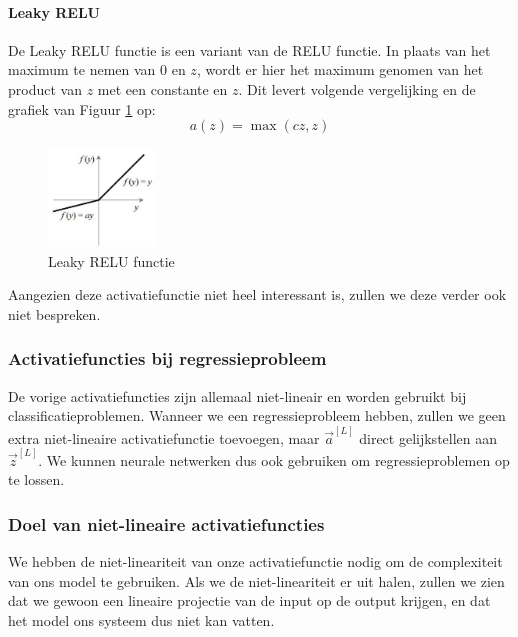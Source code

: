 \paragraph{Leaky RELU}

De Leaky RELU functie is een variant van de RELU functie. In plaats van het maximum te nemen van 0 en $z$, wordt er hier het maximum genomen van het product van $z$ met een constante en $z$. Dit levert volgende vergelijking en de grafiek van Figuur \ref{fig:leaky-relu} op:
\begin{equation}
	a(z) = \max(cz, z)
\end{equation}

\begin{figure}[h]
	\centering
	\includegraphics[width=0.25\textwidth]{images/17-leaky-relu.png}
	\caption{Leaky RELU functie}
	\label{fig:leaky-relu}
\end{figure}
\noindent
Aangezien deze activatiefunctie niet heel interessant is, zullen we deze verder ook niet bespreken.

\subsubsection{Activatiefuncties bij regressieprobleem}

De vorige activatiefuncties zijn allemaal niet-lineair en worden gebruikt bij classificatieproblemen. Wanneer we een regressieprobleem hebben, zullen we geen extra niet-lineaire activatiefunctie toevoegen, maar $\vec{a}^{[L]}$ direct gelijkstellen aan $\vec{z}^{[L]}$. We kunnen neurale netwerken dus ook gebruiken om regressieproblemen op te lossen. 

\subsubsection{Doel van niet-lineaire activatiefuncties}

We hebben de niet-lineariteit van onze activatiefunctie nodig om de complexiteit van ons model te gebruiken. Als we de niet-lineariteit er uit halen, zullen we zien dat we gewoon een lineaire projectie van de input op de output krijgen, en dat het model ons systeem dus niet kan vatten.


